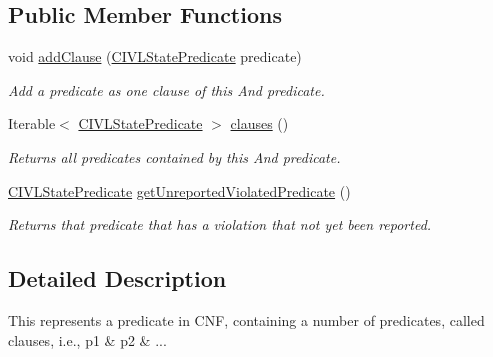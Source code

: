 \subsection*{Public Member Functions}
\begin{DoxyCompactItemize}
\item 
\hypertarget{interfaceedu_1_1udel_1_1cis_1_1vsl_1_1civl_1_1predicate_1_1IF_1_1AndPredicate_aa4edbacc439482ff68e80520952e3fa3}{}void \hyperlink{interfaceedu_1_1udel_1_1cis_1_1vsl_1_1civl_1_1predicate_1_1IF_1_1AndPredicate_aa4edbacc439482ff68e80520952e3fa3}{add\+Clause} (\hyperlink{interfaceedu_1_1udel_1_1cis_1_1vsl_1_1civl_1_1predicate_1_1IF_1_1CIVLStatePredicate}{C\+I\+V\+L\+State\+Predicate} predicate)\label{interfaceedu_1_1udel_1_1cis_1_1vsl_1_1civl_1_1predicate_1_1IF_1_1AndPredicate_aa4edbacc439482ff68e80520952e3fa3}

\begin{DoxyCompactList}\small\item\em Add a predicate as one clause of this And predicate. \end{DoxyCompactList}\item 
Iterable$<$ \hyperlink{interfaceedu_1_1udel_1_1cis_1_1vsl_1_1civl_1_1predicate_1_1IF_1_1CIVLStatePredicate}{C\+I\+V\+L\+State\+Predicate} $>$ \hyperlink{interfaceedu_1_1udel_1_1cis_1_1vsl_1_1civl_1_1predicate_1_1IF_1_1AndPredicate_a64e05b8917b8d735aaf47a13d37357a6}{clauses} ()
\begin{DoxyCompactList}\small\item\em Returns all predicates contained by this And predicate. \end{DoxyCompactList}\item 
\hyperlink{interfaceedu_1_1udel_1_1cis_1_1vsl_1_1civl_1_1predicate_1_1IF_1_1CIVLStatePredicate}{C\+I\+V\+L\+State\+Predicate} \hyperlink{interfaceedu_1_1udel_1_1cis_1_1vsl_1_1civl_1_1predicate_1_1IF_1_1AndPredicate_ad92067c90a11371ce37dda5f96a0534a}{get\+Unreported\+Violated\+Predicate} ()
\begin{DoxyCompactList}\small\item\em Returns that predicate that has a violation that not yet been reported. \end{DoxyCompactList}\end{DoxyCompactItemize}


\subsection{Detailed Description}
This represents a predicate in C\+N\+F, containing a number of predicates, called clauses, i.\+e., p1 \& p2 \& ... 

